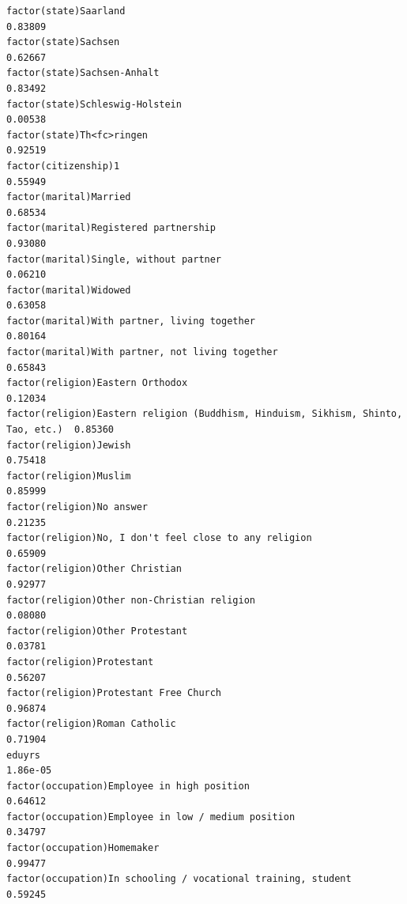\documentclass[
]{article}
\begin{document}
\begin{table}
\begin{minipage}[t]{\linewidth}
{\begin{verbatim}
factor(state)Saarland                                                              0.83809
factor(state)Sachsen                                                               0.62667
factor(state)Sachsen-Anhalt                                                        0.83492
factor(state)Schleswig-Holstein                                                    0.00538
factor(state)Th<fc>ringen                                                          0.92519
factor(citizenship)1                                                               0.55949
factor(marital)Married                                                             0.68534
factor(marital)Registered partnership                                              0.93080
factor(marital)Single, without partner                                             0.06210
factor(marital)Widowed                                                             0.63058
factor(marital)With partner, living together                                       0.80164
factor(marital)With partner, not living together                                   0.65843
factor(religion)Eastern Orthodox                                                   0.12034
factor(religion)Eastern religion (Buddhism, Hinduism, Sikhism, Shinto, Tao, etc.)  0.85360
factor(religion)Jewish                                                             0.75418
factor(religion)Muslim                                                             0.85999
factor(religion)No answer                                                          0.21235
factor(religion)No, I don't feel close to any religion                             0.65909
factor(religion)Other Christian                                                    0.92977
factor(religion)Other non-Christian religion                                       0.08080
factor(religion)Other Protestant                                                   0.03781
factor(religion)Protestant                                                         0.56207
factor(religion)Protestant Free Church                                             0.96874
factor(religion)Roman Catholic                                                     0.71904
eduyrs                                                                            1.86e-05
factor(occupation)Employee in high position                                        0.64612
factor(occupation)Employee in low / medium position                                0.34797
factor(occupation)Homemaker                                                        0.99477
factor(occupation)In schooling / vocational training, student                      0.59245

\end{verbatim}}
\end{minipage}
\end{table}
\end{document}
